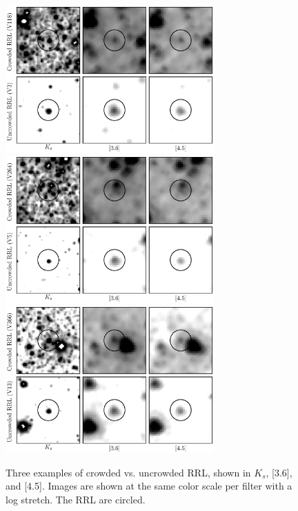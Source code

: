\documentclass[a4paper,fleqn,usenatbib]{mnras}
\begin{document}
\begin{figure}
\begin{center}
\includegraphics[width=80mm]{../ocen_only_fitting/final_plots/crowding_example_3_118.eps}
\includegraphics[width=80mm]{../ocen_only_fitting/final_plots/crowding_example_5_264.eps}
\includegraphics[width=80mm]{../ocen_only_fitting/final_plots/crowding_example_13_366.eps}
\caption{Three examples of crowded vs. uncrowded RRL, shown in $K_s$, [3.6], and [4.5]. Images are shown at the same color scale per filter with a log stretch. The RRL are circled.} 
\label{fig:crowding}
\end{center}
\end{figure}

\end{document}
